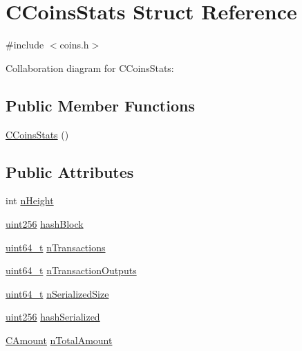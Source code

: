 \hypertarget{struct_c_coins_stats}{}\section{C\+Coins\+Stats Struct Reference}
\label{struct_c_coins_stats}


{\ttfamily \#include $<$coins.\+h$>$}



Collaboration diagram for C\+Coins\+Stats\+:
\subsection*{Public Member Functions}
\begin{DoxyCompactItemize}
\item 
\hyperlink{struct_c_coins_stats_a3f68ce1f423e40599c8d3c4bf2d97aa9}{C\+Coins\+Stats} ()
\end{DoxyCompactItemize}
\subsection*{Public Attributes}
\begin{DoxyCompactItemize}
\item 
int \hyperlink{struct_c_coins_stats_a5972700c4733ce02e12530d758e95d8c}{n\+Height}
\item 
\hyperlink{classuint256}{uint256} \hyperlink{struct_c_coins_stats_a75b32757ea85b8df6453490e1acc4607}{hash\+Block}
\item 
\hyperlink{stdint_8h_aaa5d1cd013383c889537491c3cfd9aad}{uint64\+\_\+t} \hyperlink{struct_c_coins_stats_a0b04da159443c350e9b9e8a39c6a82db}{n\+Transactions}
\item 
\hyperlink{stdint_8h_aaa5d1cd013383c889537491c3cfd9aad}{uint64\+\_\+t} \hyperlink{struct_c_coins_stats_a02612be210ba7c628d04ddedd83b9ff0}{n\+Transaction\+Outputs}
\item 
\hyperlink{stdint_8h_aaa5d1cd013383c889537491c3cfd9aad}{uint64\+\_\+t} \hyperlink{struct_c_coins_stats_ac4302ffc2f8be6e62dbc5655f77e4202}{n\+Serialized\+Size}
\item 
\hyperlink{classuint256}{uint256} \hyperlink{struct_c_coins_stats_a0ce8e745d7a62e4ae41f943333c81d7c}{hash\+Serialized}
\item 
\hyperlink{amount_8h_a4eaf3a5239714d8c45b851527f7cb564}{C\+Amount} \hyperlink{struct_c_coins_stats_a97c76344c650e55377d5f9246a906cc4}{n\+Total\+Amount}
\end{DoxyCompactItemize}


